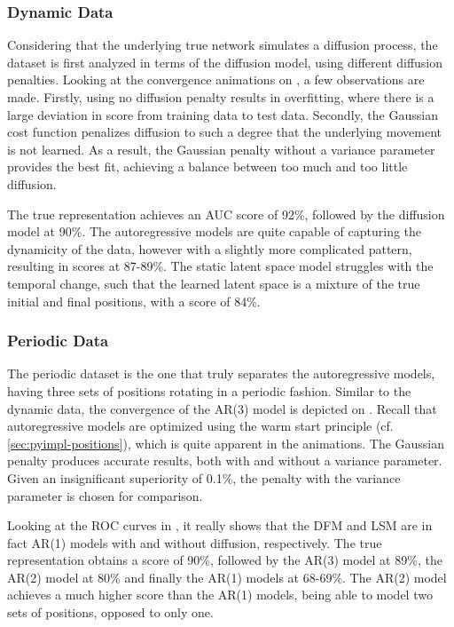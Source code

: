     \subsubsection{Dynamic Data}
    
        Considering that the underlying true network simulates a diffusion process, the dataset is first analyzed in terms of the diffusion model, using different diffusion penalties. Looking at the convergence animations on , a few observations are made. Firstly, using no diffusion penalty results in overfitting, where there is a large deviation in score from training data to test data. Secondly, the Gaussian cost function penalizes diffusion to such a degree that the underlying movement is not learned. As a result, the Gaussian penalty without a variance parameter provides the best fit, achieving a balance between too much and too little diffusion.
        
        The true representation achieves an AUC score of 92\%, followed by the diffusion model at 90\%. The autoregressive models are quite capable of capturing the dynamicity of the data, however with a slightly more complicated pattern, resulting in scores at 87-89\%. The static latent space model struggles with the temporal change, such that the learned latent space is a mixture of the true initial and final positions, with a score of 84\%. 
    
    \subsubsection{Periodic Data}
    
        The periodic dataset is the one that truly separates the autoregressive models, having three sets of positions rotating in a periodic fashion. Similar to the dynamic data, the convergence of the AR(3) model is depicted on . Recall that autoregressive models are optimized using the warm start principle (cf. \cref{sec:pyimpl-positions}), which is quite apparent in the animations. The Gaussian penalty produces accurate results, both with and without a variance parameter. Given an insignificant superiority of 0.1\%, the penalty with the variance parameter is chosen for comparison.
        
        Looking at the ROC curves in , it really shows that the DFM and LSM are in fact AR(1) models with and without diffusion, respectively. The true representation obtains a score of 90\%, followed by the AR(3) model at 89\%, the AR(2) model at 80\% and finally the AR(1) models at 68-69\%. The AR(2) model achieves a much higher score than the AR(1) models, being able to model two sets of positions, opposed to only one.
    
